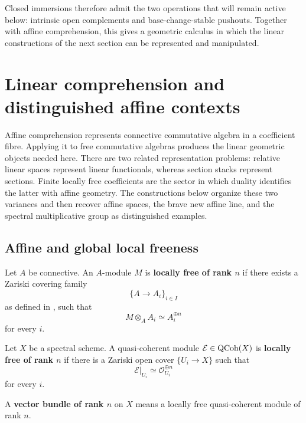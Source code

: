 Closed immersions therefore admit the two operations that will remain active
below: intrinsic open complements and base-change-stable pushouts. Together
with affine comprehension, this gives a geometric calculus in which the
linear constructions of the next section can be represented and manipulated.

\section{Linear comprehension and distinguished affine contexts}
\label{sec:vector-bundles-brave-new-affine-spaces}

Affine comprehension represents connective commutative algebra in a
coefficient fibre. Applying it to free commutative algebras produces the
linear geometric objects needed here. There are two related representation
problems: relative linear spaces represent linear functionals, whereas section
stacks represent sections. Finite locally free coefficients are the sector in
which duality identifies the latter with affine geometry. The constructions
below organize these two variances and then recover affine spaces, the brave
new affine line, and the spectral multiplicative group as distinguished
examples.

\subsection{Affine and global local freeness}


\begin{definition}
\label{def:locally-free-affine-module}
Let $A$ be connective. An $A$-module $M$ is \textbf{locally free of rank
$n$} if there exists a Zariski covering family
\[
    \{A\to A_i\}_{i\in I}
\]
as defined in , such that
\[
    M\otimes_AA_i
    \simeq
    A_i^{\oplus n}
\]
for every $i$.
\end{definition}


\begin{definition}
\label{def:locally-free-qcoh}
Let $X$ be a spectral scheme. A quasi-coherent module
$\mathcal E\in\operatorname{QCoh}(X)$ is \textbf{locally free of rank $n$} if there is a
Zariski open cover $\{U_i\to X\}$ such that
\[
    \mathcal E|_{U_i}
    \simeq
    \mathcal O_{U_i}^{\oplus n}
\]
for every $i$.
\end{definition}

A \textbf{vector bundle of rank $n$} on $X$ means a locally free
quasi-coherent module of rank $n$.

